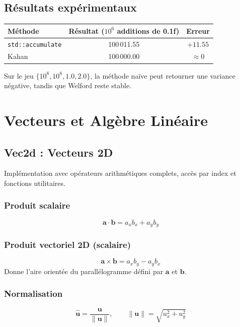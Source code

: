\documentclass[11pt,a4paper]{article}
\begin{document}
\subsection{Résultats expérimentaux}

\begin{center}
\renewcommand{\arraystretch}{1.3}
\begin{tabular}{lcc}
\toprule
\textbf{Méthode} & \textbf{Résultat} ($10^6$ additions de 0.1f) & \textbf{Erreur} \\
\midrule
\texttt{std::accumulate} & 100\,011.55 & $+11.55$ \\
Kahan & 100\,000.00 & $\approx 0$ \\
\bottomrule
\end{tabular}
\end{center}

Sur le jeu $\{10^8, 10^8, 1.0, 2.0\}$, la méthode naïve peut retourner une variance négative, tandis que Welford reste stable.

\newpage

\section{Vecteurs et Algèbre Linéaire}

\subsection{Vec2d : Vecteurs 2D}

Implémentation avec opérateurs arithmétiques complets, accès par index et fonctions utilitaires.

\subsubsection{Produit scalaire}
\[
\mathbf{a} \cdot \mathbf{b} = a_x b_x + a_y b_y
\]

\subsubsection{Produit vectoriel 2D (scalaire)}
\[
\mathbf{a} \times \mathbf{b} = a_x b_y - a_y b_x
\]
Donne l'aire orientée du parallélogramme défini par $\mathbf{a}$ et $\mathbf{b}$.

\subsubsection{Normalisation}
\[
\hat{\mathbf{u}} = \frac{\mathbf{u}}{\|\mathbf{u}\|}, \qquad \|\mathbf{u}\| = \sqrt{u_x^2 + u_y^2}
\]
\end{document}
